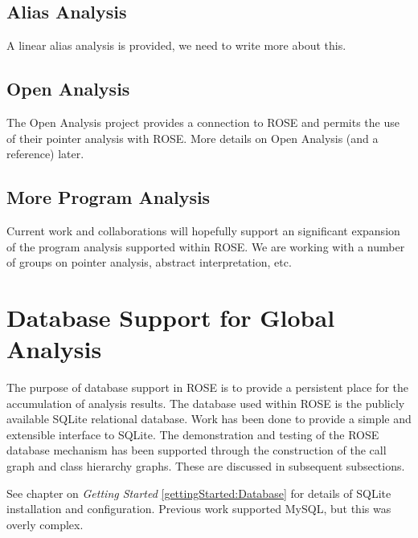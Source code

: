 \subsection{Alias Analysis}

   A linear alias analysis is provided, we need to write more about this.


\subsection{Open Analysis}

   The Open Analysis project provides a connection to ROSE and permits
the use of their pointer analysis with ROSE.  More details on Open Analysis
(and a reference) later.

\subsection{More Program Analysis}

   Current work and collaborations will hopefully support an significant 
expansion of the program analysis supported within ROSE.  We are working with
a number of groups on pointer analysis, abstract interpretation, etc.

\section{Database Support for Global Analysis}
\label{RoseExamples:RoseTutorial:Database}

   The purpose of database support in ROSE is to provide a persistent
place for the accumulation of analysis results.  The database used within ROSE
is the publicly available SQLite relational database.  Work has
been done to provide a simple and extensible interface to SQLite.  The 
demonstration and testing of the ROSE database mechanism has been supported 
through the construction of the call graph and class hierarchy graphs. These
are discussed in subsequent subsections.

See chapter on {\em Getting Started} \ref{gettingStarted:Database}
for details of SQLite installation and configuration.  Previous work
supported MySQL, but this was overly complex.

